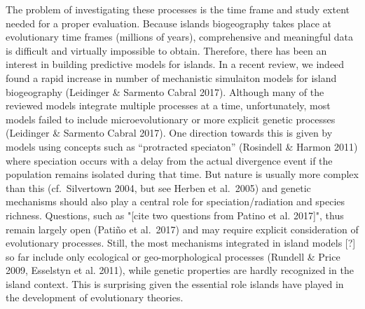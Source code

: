 \documentclass[a4paper]{scrartcl}
\begin{document}
The problem of investigating these processes is the time frame and study extent needed for a proper evaluation.
Because islands biogeography takes place at evolutionary time frames (millions of years),
comprehensive and meaningful data is difficult and virtually impossible to obtain.
Therefore, there has been an interest in building predictive models for islands.
In a recent review, we indeed found a rapid increase in number of mechanistic simulaiton models for island biogeography %
(Leidinger \& Sarmento Cabral 2017).
Although many of the reviewed models integrate multiple processes at a time, unfortunately,
most models failed to include microevolutionary or more explicit genetic processes %
(Leidinger \& Sarmento Cabral 2017).
One direction towards this is given by models using concepts such as ``protracted speciaton'' (Rosindell \& Harmon 2011) %
where speciation occurs with a delay from the actual
divergence event if the population remains isolated during that time.
But nature is usually more complex than this (cf.\ Silvertown 2004, but see Herben et al.\ 2005)
and genetic mechanisms should also play a central role for speciation/radiation and species richness.
Questions, such as "[cite two questions from Patino et al. 2017]", thus remain largely open (Patiño et al.\ 2017)
and may require explicit consideration of evolutionary processes.
Still, the most mechanisms integrated in island models [?] so far include only ecological
or geo-morphological processes (Rundell \& Price 2009, Esselstyn et al. 2011),
while genetic properties are hardly recognized in the island context.
This is surprising given the essential role islands have played in the development of evolutionary theories.

\end{document}
